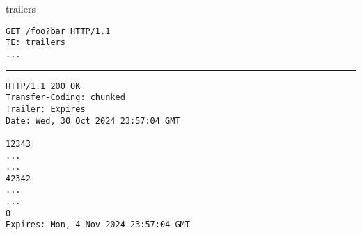 \begin{frame}[fragile]{trailers}
\begin{Verbatim}[fontsize=\fontsize{9}{10}]
GET /foo?bar HTTP/1.1
TE: trailers
...
\end{Verbatim}
\rule{.9\textwidth}{1mm}
\begin{Verbatim}[fontsize=\fontsize{9}{10}]
HTTP/1.1 200 OK
Transfer-Coding: chunked
Trailer: Expires
Date: Wed, 30 Oct 2024 23:57:04 GMT

12343
...
...
42342
...
...
0
Expires: Mon, 4 Nov 2024 23:57:04 GMT
\end{Verbatim}
\end{frame}
